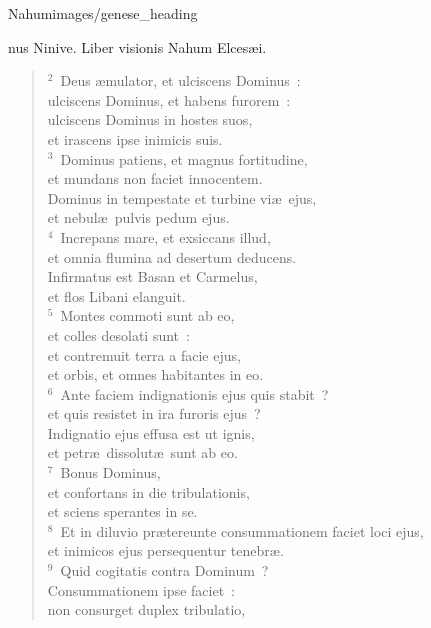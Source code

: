 {Nahum}{images/genese_heading}


\bchapter
{}nus Ninive. Liber visionis Nahum Elces\ae i.


\begin{flushleft}\begin{verse}\vspace{6pt}${}^{2}$~Deus \ae mulator, et ulciscens Dominus~:\\ ulciscens Dominus, et habens furorem~:\\ ulciscens Dominus in hostes suos,\\ et irascens ipse inimicis suis.\\
${}^{3}$~Dominus patiens, et magnus fortitudine,\\ et mundans non faciet innocentem.\\ Dominus in tempestate et turbine vi\ae\ ejus,\\ et nebul\ae\ pulvis pedum ejus.\\
${}^{4}$~Increpans mare, et exsiccans illud,\\ et omnia flumina ad desertum deducens.\\ Infirmatus est Basan et Carmelus,\\ et flos Libani elanguit.\\
${}^{5}$~Montes commoti sunt ab eo,\\ et colles desolati sunt~:\\ et contremuit terra a facie ejus,\\ et orbis, et omnes habitantes in eo.\\
${}^{6}$~Ante faciem indignationis ejus quis stabit~?\\ et quis resistet in ira furoris ejus~?\\ Indignatio ejus effusa est ut ignis,\\ et petr\ae\ dissolut\ae\ sunt ab eo.\\
${}^{7}$~Bonus Dominus,\\ et confortans in die tribulationis,\\ et sciens sperantes in se.\\
${}^{8}$~Et in diluvio pr\ae tereunte consummationem faciet loci ejus,\\ et inimicos ejus persequentur tenebr\ae .\\
${}^{9}$~Quid cogitatis contra Dominum~?\\ Consummationem ipse faciet~:\\ non consurget duplex tribulatio,\\

\end{verse}
\end{flushleft}

